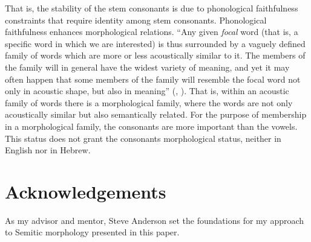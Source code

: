 \documentclass[output=paper,
modfonts
]{LSP/langsci}
\begin{document}
That is, the stability of the stem consonants is due to phonological
faithfulness constraints that require identity among stem consonants.
Phonological faithfulness enhances morphological relations. ``Any given
\emph{focal} word (that is, a specific word in which we are interested)
is thus surrounded by a vaguely defined family of words which are more
or less acoustically similar to it. The members of the family will in
general have the widest variety of meaning, and yet it may often happen
that some members of the family will resemble the focal word not only in
acoustic shape, but also in meaning'' (\citealt[297]{Hockett1958}, \citeyear[86]{hockett1987a}). That
is, within an acoustic family of words there is a morphological family,
where the words are not only acoustically similar but also semantically
related. For the purpose of membership in a morphological family, the
consonants are more important than the vowels. This status does not
grant the consonants morphological status, neither in English nor in
Hebrew.

\section*{Acknowledgements}
As my advisor and mentor, Steve Anderson set the foundations for my approach to Semitic morphology presented in this paper.

\printbibliography[heading=subbibliography,notkeyword=this]

\end{document}

